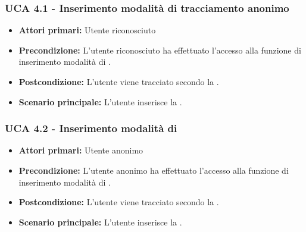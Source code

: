 \subsubsection{UCA 4.1 - Inserimento modalità di tracciamento anonimo}%
\begin{itemize}
	\item \textbf{Attori primari:} Utente riconosciuto
	\item \textbf{Precondizione:} L'utente riconosciuto ha effettuato l'accesso alla funzione di inserimento modalità di .
	\item \textbf{Postcondizione:} L'utente viene tracciato secondo la .
	\item \textbf{Scenario principale:} L'utente inserisce la .
\end{itemize}

\subsubsection{UCA 4.2 - Inserimento modalità di }%
\begin{itemize}
	\item \textbf{Attori primari:} Utente anonimo
	\item \textbf{Precondizione:} L'utente anonimo ha effettuato l'accesso alla funzione di inserimento modalità di .
	\item \textbf{Postcondizione:} L'utente viene tracciato secondo la .
	\item \textbf{Scenario principale:} L'utente inserisce la .
\end{itemize}
